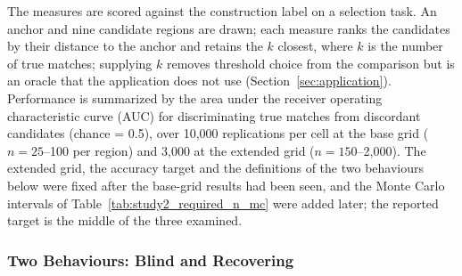 \documentclass[AMA,Times1COL]{WileyNJDv5}
\begin{document}
The measures are scored against the construction label on a selection task. An anchor and nine candidate regions are drawn; each measure ranks the candidates by their distance to the anchor and retains the $k$ closest, where $k$ is the number of true matches; supplying $k$ removes threshold choice from the comparison but is an oracle that the application does not use (Section~\ref{sec:application}). Performance is summarized by the area under the receiver operating characteristic curve (AUC) for discriminating true matches from discordant candidates (chance = 0.5), over 10{,}000 replications per cell at the base grid ($n = 25$--100 per region) and 3{,}000 at the extended grid ($n = 150$--2{,}000). The extended grid, the accuracy target and the definitions of the two behaviours below were fixed after the base-grid results had been seen, and the Monte Carlo intervals of Table~\ref{tab:study2_required_n_mc} were added later; the reported target is the middle of the three examined.

\subsubsection{Two Behaviours: Blind and Recovering}\label{sec:study1_classification}
\end{document}

